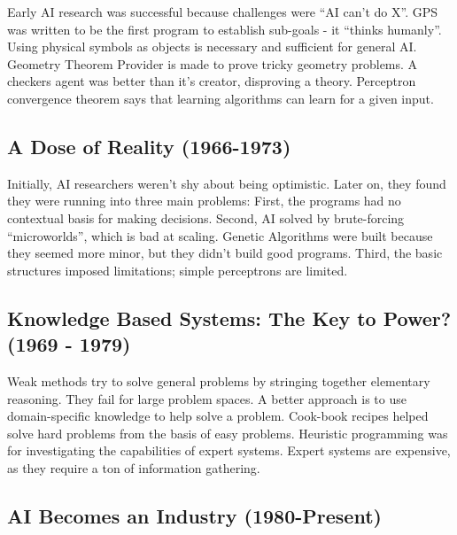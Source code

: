 Early AI research was successful because challenges were ``AI can't do X''.
GPS was written to be the first program to establish sub-goals - it
``thinks humanly''.
Using physical symbols as objects is necessary and sufficient for general AI.
Geometry Theorem Provider is made to prove tricky geometry problems.
A checkers agent was better than it's creator, disproving a theory.
Perceptron convergence theorem says that learning algorithms can learn for a
given input.


\subsection{A Dose of Reality (1966-1973)} %
\label{sub:a_dose_of_reality_}

Initially, AI researchers weren't shy about being optimistic.
Later on, they found they were running into three main problems:
First, the programs had no contextual basis for making decisions.
Second, AI solved by brute-forcing ``microworlds'', which is bad at scaling.
Genetic Algorithms were built because they seemed more minor, but they didn't
build good programs.
Third, the basic structures imposed limitations; simple perceptrons are limited.


\subsection{Knowledge Based Systems: The Key to Power? (1969 - 1979)} %
\label{sub:knowledge_based_systems_the_key_to_power_}

Weak methods try to solve general problems by stringing together elementary
reasoning.
They fail for large problem spaces.
A better approach is to use domain-specific knowledge to help solve a problem.
Cook-book recipes helped solve hard problems from the basis of easy problems.
Heuristic programming was for investigating the capabilities of expert systems.
Expert systems are expensive, as they require a ton of information gathering.


\subsection{AI Becomes an Industry (1980-Present)} %
\label{sub:ai_becomes_an_industry_}

